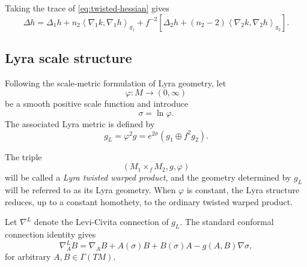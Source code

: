 \documentclass[a4paper,11pt]{article}
\theoremstyle{plain}
\numberwithin{equation}{section}
\begin{document}
Taking the trace of \eqref{eq:twisted-hessian} gives
\begin{equation}
	\Delta h
	=
	\Delta_{1}h
	+
	n_{2}
	\left\langle\nabla_{1}k,\nabla_{1}h\right\rangle_{g_{1}}
	+
	f^{-2}
	\left[
	\Delta_{2}h
	+
	(n_{2}-2)
	\left\langle\nabla_{2}k,\nabla_{2}h\right\rangle_{g_{2}}
	\right].
	\label{eq:twisted-laplacian}
\end{equation}

\subsection{Lyra scale structure}
\label{subsec:lyra-scale-structure}

Following the scale-metric formulation of Lyra geometry, let
\[
\varphi:M\longrightarrow(0,\infty)
\]
be a smooth positive scale function and introduce
\begin{equation}
	\sigma=\ln\varphi.
	\label{eq:logarithmic-lyra-scale}
\end{equation}
The associated Lyra metric is defined by
\begin{equation}
	g_{L}
	=
	\varphi^{2}g
	=
	e^{2\sigma}
	\left(
	g_{1}\oplus f^{2}g_{2}
	\right).
	\label{eq:lyra-twisted-metric}
\end{equation}

The triple
\begin{equation}
	\left(
	M_{1}\times_{f}M_{2},
	g,
	\varphi
	\right)
	\label{eq:lyra-twisted-product}
\end{equation}
will be called a \emph{Lyra twisted warped product}, and the
geometry determined by \(g_{L}\) will be referred to as its Lyra
geometry. When \(\varphi\) is constant, the Lyra structure reduces,
up to a constant homothety, to the ordinary twisted warped product.

Let \(\nabla^{L}\) denote the Levi-Civita connection of \(g_{L}\).
The standard conformal connection identity gives
\begin{equation}
	\nabla^{L}_{A}B
	=
	\nabla_{A}B
	+
	A(\sigma)B
	+
	B(\sigma)A
	-
	g(A,B)\nabla\sigma,
	\label{eq:lyra-connection-general}
\end{equation}
for arbitrary \(A,B\in\Gamma(TM)\).
\end{document}
